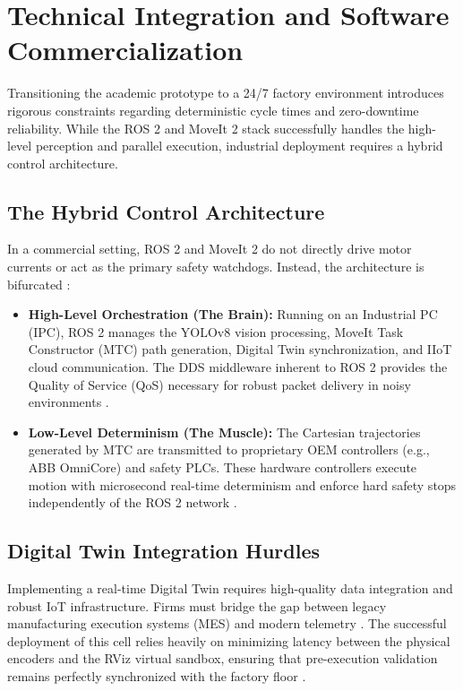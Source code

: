 \section{Technical Integration and Software Commercialization}

Transitioning the academic prototype to a 24/7 factory environment introduces rigorous constraints regarding deterministic cycle times and zero-downtime reliability. While the ROS 2 and MoveIt 2 stack successfully handles the high-level perception and parallel execution, industrial deployment requires a hybrid control architecture.

\subsection{The Hybrid Control Architecture}
In a commercial setting, ROS 2 and MoveIt 2 do not directly drive motor currents or act as the primary safety watchdogs. Instead, the architecture is bifurcated \cite{mdpi2026interoperability}:
\begin{itemize}
    \item \textbf{High-Level Orchestration (The Brain):} Running on an Industrial PC (IPC), ROS 2 manages the YOLOv8 vision processing, MoveIt Task Constructor (MTC) path generation, Digital Twin synchronization, and IIoT cloud communication. The DDS middleware inherent to ROS 2 provides the Quality of Service (QoS) necessary for robust packet delivery in noisy environments \cite{profanter2019protocols}.
    \item \textbf{Low-Level Determinism (The Muscle):} The Cartesian trajectories generated by MTC are transmitted to proprietary OEM controllers (e.g., ABB OmniCore) and safety PLCs. These hardware controllers execute motion with microsecond real-time determinism and enforce hard safety stops independently of the ROS 2 network \cite{mdpi2026interoperability}.
\end{itemize}

\subsection{Digital Twin Integration Hurdles}
Implementing a real-time Digital Twin requires high-quality data integration and robust IoT infrastructure. Firms must bridge the gap between legacy manufacturing execution systems (MES) and modern telemetry \cite{xu2023survey}. The successful deployment of this cell relies heavily on minimizing latency between the physical encoders and the RViz virtual sandbox, ensuring that pre-execution validation remains perfectly synchronized with the factory floor \cite{researchgate2026digitaltwin}.